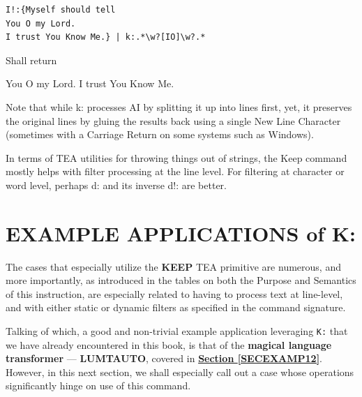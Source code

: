 \documentclass[a4paper, 18pt]{book} %
\begin{document}
  \begin{tcolorbox}[teaterminalstyle, title=K: EXAMPLE 1]
  \begin{lstlisting}[language=TEA]
I!:{Myself should tell 
You O my Lord.
I trust You Know Me.} | k:.*\w?[IO]\w?.*
   \end{lstlisting}
  \end{tcolorbox}



\vspace{2em}

Shall return 

\vspace{2em}	


  \begin{tcbverbatim}[title=K: EXAMPLE 1 Output]
You O my Lord.
I trust You Know Me.
  \end{tcbverbatim}


{
\Large

Note that while k: processes AI by splitting it up into lines first, yet, it preserves the original lines by gluing the results back using a single New Line Character (sometimes with a Carriage Return on some systems such as Windows).

}

\vspace{2em}

In terms of TEA utilities for throwing things out of strings, the Keep command mostly helps with filter processing at the line level. For filtering at character or word level, perhaps d: and its inverse d!: are better.




\section{EXAMPLE APPLICATIONS of K:}
\label{SECEXAMPK}


The cases that especially utilize the \textbf{KEEP} TEA primitive are numerous, and more importantly, as introduced in the tables on both the Purpose and Semantics of this instruction, are especially related to having to process text at line-level, and with either static or dynamic filters as specified in the command signature.

\vspace{2em}

Talking of which, a good and non-trivial example application leveraging \texttt{K:} that we have already encountered in this book, is that of the \textbf{magical language transformer}\cite{lutalo_2025_grimlumtauto} --- \textbf{LUMTAUTO}, covered in \textbf{\hyperref[SECEXAMP12]{Section \ref{SECEXAMP12}}}. However, in this next section, we shall especially call out a case whose operations significantly hinge on use of this command.
\end{document}
